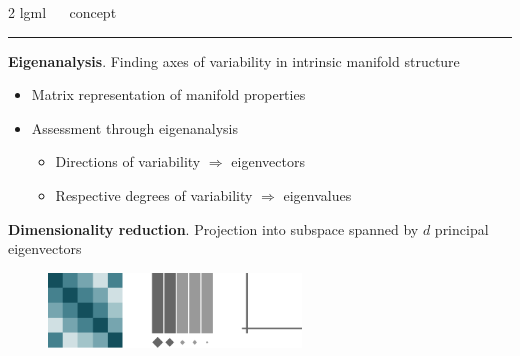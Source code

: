 \documentclass[11pt, compress, t, notes = noshow, xcolor = table, 
aspectratio = 1610]{beamer}
\newcommand{\highlight}[1]{\textcolor{highlightcol}{\textbf{#1}}}
\newcommand{\arritem}{\item[\highlight{$\rightarrow$}]}
\newcommand{\flexitem}[1]{\item[$\highlight{#1}$]}
\begin{document}

\LARGE
\begin{frame}{\textcolor{gray!90}{2 lgml} ~~ concept}
\normalsize
\vspace{-0.5cm}
\noindent \textcolor{gray!90}{\rule{\textwidth}{1pt}}
\smallskip

\textbf{Eigenanalysis}. Finding axes of variability in intrinsic 
manifold structure

\begin{itemize}
  \arritem Matrix representation of manifold properties
  \arritem Assessment through eigenanalysis
  \begin{itemize}
    \arritem Directions of variability $\Rightarrow$ eigenvectors
    \arritem Respective degrees of variability $\Rightarrow$ eigenvalues
  \end{itemize}
\end{itemize}

\vspace{0.3cm}

\textbf{Dimensionality reduction}. Projection into subspace 
spanned by $d$ principal eigenvectors

\vspace{0.3cm}

\begin{figure}[H]
  \raggedright
  \includegraphics[trim = 0 0 0 0, clip, %
    width = 0.6\textwidth]{figures/eigenanalysis}
\end{figure}

\end{frame}


% 
% 
\end{document}
